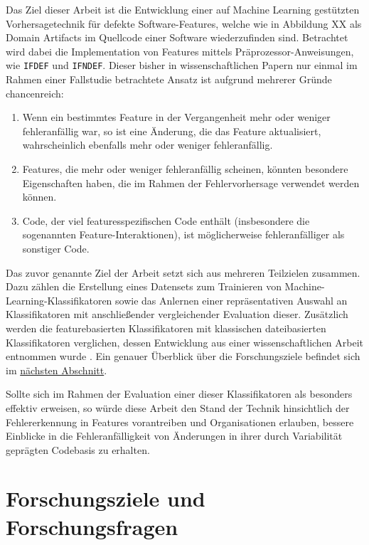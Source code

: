 Das Ziel dieser Arbeit ist die Entwicklung einer auf Machine Learning gestützten Vorhersagetechnik für defekte Software-Features, welche wie in Abbildung XX als Domain Artifacts im Quellcode einer Software wiederzufinden sind. Betrachtet wird dabei die Implementation von Features mittels Präprozessor-Anweisungen, wie \texttt{IFDEF} und \texttt{IFNDEF}. Dieser bisher in wissenschaftlichen Papern nur einmal im Rahmen einer Fallstudie betrachtete Ansatz \cite{Queiroz2016} ist aufgrund mehrerer Gründe chancenreich:

\begin{enumerate}
\item Wenn ein bestimmtes Feature in der Vergangenheit mehr oder weniger fehleranfällig war, so ist eine Änderung, die das Feature aktualisiert, wahrscheinlich ebenfalls mehr oder weniger fehleranfällig. 
\item Features, die mehr oder weniger fehleranfällig scheinen, könnten besondere Eigenschaften haben, die im Rahmen der Fehlervorhersage verwendet werden können.
\item Code, der viel featuresspezifischen Code enthält (insbesondere die sogenannten Feature-Interaktionen), ist möglicherweise fehleranfälliger als sonstiger Code.
\end{enumerate}

Das zuvor genannte Ziel der Arbeit setzt sich aus mehreren Teilzielen zusammen. Dazu zählen die Erstellung eines Datensets zum Trainieren von Machine-Learning-Klassifikatoren sowie das Anlernen einer repräsentativen Auswahl an Klassifikatoren mit anschließender vergleichender Evaluation dieser. Zusätzlich werden die featurebasierten Klassifikatoren mit klassischen dateibasierten Klassifikatoren verglichen, dessen Entwicklung aus einer wissenschaftlichen Arbeit entnommen wurde \cite{Moser2008}. Ein genauer Überblick über die Forschungsziele befindet sich im \hyperref[research_objectives]{nächsten Abschnitt}.

Sollte sich im Rahmen der Evaluation einer dieser Klassifikatoren als besonders effektiv erweisen, so würde diese Arbeit den Stand der Technik hinsichtlich der Fehlererkennung in Features vorantreiben und Organisationen erlauben, bessere Einblicke in die Fehleranfälligkeit von Änderungen in ihrer durch Variabilität geprägten Codebasis zu erhalten.

\section{Forschungsziele und Forschungsfragen}


